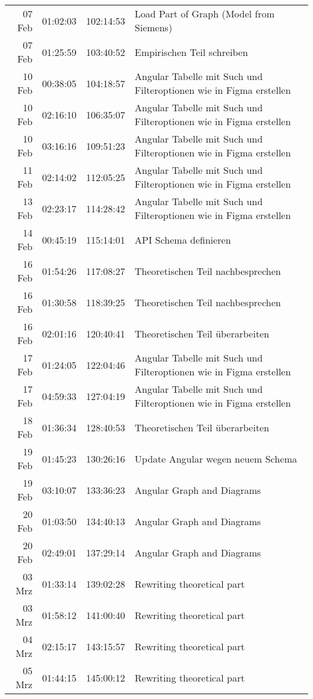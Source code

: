 \begin{longtable}{r | r | r | p{}}
	 07 Feb & 01:02:03 & 102:14:53 & Load Part of Graph (Model from Siemens) \\ 
	 07 Feb & 01:25:59 & 103:40:52 & Empirischen Teil schreiben \\ 
	 10 Feb & 00:38:05 & 104:18:57 & Angular Tabelle mit Such und Filteroptionen wie in Figma erstellen \\ 
	 10 Feb & 02:16:10 & 106:35:07 & Angular Tabelle mit Such und Filteroptionen wie in Figma erstellen \\ 
	 10 Feb & 03:16:16 & 109:51:23 & Angular Tabelle mit Such und Filteroptionen wie in Figma erstellen \\ 
	 11 Feb & 02:14:02 & 112:05:25 & Angular Tabelle mit Such und Filteroptionen wie in Figma erstellen \\ 
	 13 Feb & 02:23:17 & 114:28:42 & Angular Tabelle mit Such und Filteroptionen wie in Figma erstellen \\ 
	 14 Feb & 00:45:19 & 115:14:01 & API Schema definieren \\ 
	 16 Feb & 01:54:26 & 117:08:27 & Theoretischen Teil nachbesprechen \\ 
	 16 Feb & 01:30:58 & 118:39:25 & Theoretischen Teil nachbesprechen \\ 
	 16 Feb & 02:01:16 & 120:40:41 & Theoretischen Teil überarbeiten \\ 
	 17 Feb & 01:24:05 & 122:04:46 & Angular Tabelle mit Such und Filteroptionen wie in Figma erstellen \\ 
	 17 Feb & 04:59:33 & 127:04:19 & Angular Tabelle mit Such und Filteroptionen wie in Figma erstellen \\ 
	 18 Feb & 01:36:34 & 128:40:53 & Theoretischen Teil überarbeiten \\ 
	 19 Feb & 01:45:23 & 130:26:16 & Update Angular wegen neuem Schema \\ 
	 19 Feb & 03:10:07 & 133:36:23 & Angular Graph and Diagrams \\ 
	 20 Feb & 01:03:50 & 134:40:13 & Angular Graph and Diagrams \\ 
	 20 Feb & 02:49:01 & 137:29:14 & Angular Graph and Diagrams \\ 
	 03 Mrz & 01:33:14 & 139:02:28 & Rewriting theoretical part \\ 
	 03 Mrz & 01:58:12 & 141:00:40 & Rewriting theoretical part \\ 
	 04 Mrz & 02:15:17 & 143:15:57 & Rewriting theoretical part \\ 
	 05 Mrz & 01:44:15 & 145:00:12 & Rewriting theoretical part \\ 

\end{longtable}
